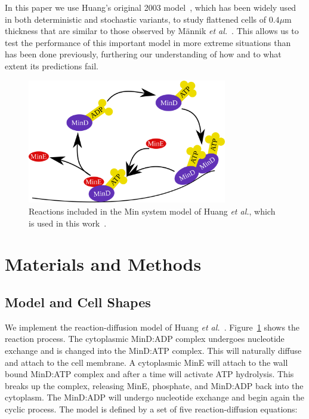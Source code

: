 \documentclass[10pt,letterpaper]{article}
\newcommand\micron{\ensuremath{\mu\text{m}}}
\newcommand{\changed}[1]{{\color{red}#1}}
\begin{document}
In this paper we use Huang's original 2003
model~\cite{huang2003dynamic}, which has been widely
used~\cite{hattne2005stochastic,huang2004min,kerr2006division,
  fange2006noise} in both deterministic and stochastic variants, to
study flattened cells of $0.4\micron$ thickness that are similar to
those observed by M\"annik \emph{et al.}~\cite{mannik2009bacterial}.
This allows us to test the performance of this important model in more
extreme situations than has been done previously, furthering our
understanding of how and to what extent \changed{its predictions
  fail}.

\begin{figure}
  \includegraphics[width=8.7cm]{reactions}
  \caption{Reactions included in the Min system model of Huang
    \emph{et al.}, which is used in this
    work~\cite{huang2003dynamic}.}\label{fig:reactions}
\end{figure}


\section*{Materials and Methods}
\subsection*{Model and Cell Shapes}
\label{sec:model-method-shapes}
We implement the reaction-diffusion model of Huang \emph{et
  al.}~\cite{huang2003dynamic}.  Figure~\ref{fig:reactions} shows the
reaction process.  The cytoplasmic MinD:ADP complex undergoes
nucleotide exchange and is changed into the MinD:ATP complex.  This
will naturally diffuse and attach to the cell membrane.  A cytoplasmic
MinE will attach to the wall bound MinD:ATP complex and after a time
will activate ATP hydrolysis.  This breaks up the complex, releasing
MinE, phosphate, and MinD:ADP back into the cytoplasm.  The MinD:ADP
will undergo nucleotide exchange and begin again the cyclic process.
The model is defined by a set of five reaction-diffusion equations:
\end{document}
